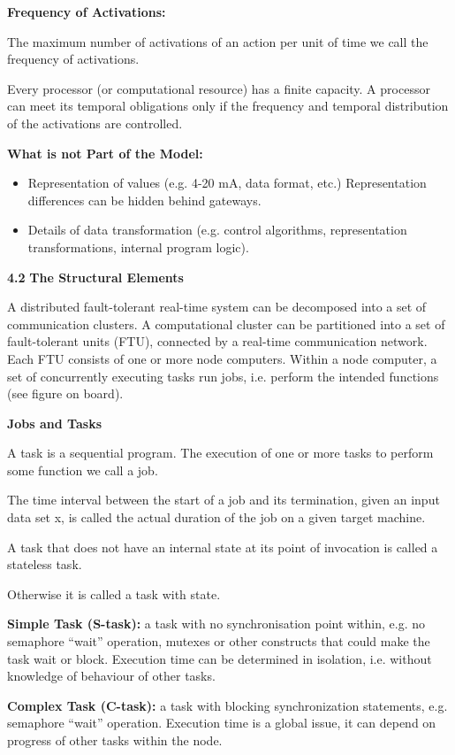 \textbf{Frequency of Activations:}

The maximum number of activations of an action per unit of time we call
the frequency of activations.

Every processor (or computational resource) has a finite capacity. A
processor can meet its temporal obligations only if the frequency and
temporal distribution of the activations are controlled.

\textbf{What is not Part of the Model:}

\begin{itemize}
\item
  Representation of values (e.g. 4-20 mA, data format, etc.)
  Representation differences can be hidden behind gateways.
\item
  Details of data transformation (e.g. control algorithms,
  representation transformations, internal program logic).
\end{itemize}

\textbf{4.2} \protect\hypertarget{teil3}{}{}\textbf{The Structural
Elements }

A distributed fault-tolerant real-time system can be decomposed into a
set of communication clusters. A computational cluster can be
partitioned into a set of fault-tolerant units (FTU), connected by a
real-time communication network. Each FTU consists of one or more node
computers. Within a node computer, a set of concurrently executing tasks
run jobs, i.e. perform the intended functions (see figure on board).

\textbf{Jobs and Tasks}

A task is a sequential program. The execution of one or more tasks to
perform some function we call a job.

The time interval between the start of a job and its termination, given
an input data set x, is called the actual duration of the job on a given
target machine.

A task that does not have an internal state at its point of invocation
is called a stateless task.

Otherwise it is called a task with state.

\textbf{Simple Task (S-task):} a task with no synchronisation point
within, e.g. no semaphore ``wait'' operation, mutexes or other
constructs that could make the task wait or block. Execution time can be
determined in isolation, i.e. without knowledge of behaviour of other
tasks.

\textbf{Complex Task (C-task):} a task with blocking synchronization
statements, e.g. semaphore ``wait'' operation. Execution time is a
global issue, it can depend on progress of other tasks within the node.

